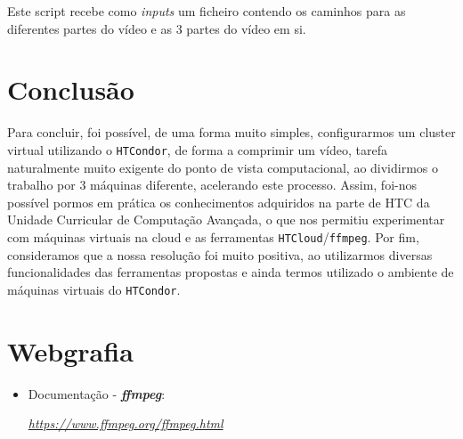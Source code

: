 \documentclass[a4paper]{report}
\begin{document}
	Este script recebe como \textit{inputs} um ficheiro contendo os caminhos para as diferentes partes do vídeo e as 3 partes do vídeo em si.

\chapter{Conclusão}
\large{
	Para concluir, foi possível, de uma forma muito simples, configurarmos um cluster virtual utilizando o \texttt{HTCondor}, de forma a comprimir um vídeo, tarefa naturalmente muito exigente do ponto de vista computacional, ao dividirmos o trabalho por 3 máquinas diferente, acelerando este processo.
	Assim, foi-nos possível pormos em prática os conhecimentos adquiridos na parte de HTC da Unidade Curricular de Computação Avançada, o que nos permitiu experimentar com máquinas virtuais na cloud e as ferramentas \texttt{HTCloud}/\texttt{ffmpeg}.
	Por fim, consideramos que a nossa resolução foi muito positiva, ao utilizarmos diversas funcionalidades das ferramentas propostas e ainda termos utilizado o ambiente de máquinas virtuais do \texttt{HTCondor}.
}

\chapter{Webgrafia}
    \begin{itemize}
        \item Documentação - \textbf{\textit{ffmpeg}}:
        \par \textit{\url{https://www.ffmpeg.org/ffmpeg.html}}
    \end{itemize}
\end{document}
